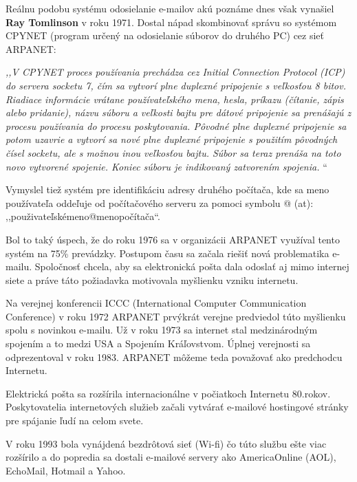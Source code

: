 \documentclass[10pt,slovak,twoside,a4paper]{article}
\begin{document}
Reálnu podobu systému odosielanie e-mailov akú poznáme dnes však vynašiel \textbf{Ray Tomlinson} v roku 1971. Dostal nápad skombinovať správu so systémom CPYNET (program určený na odosielanie súborov do druhého PC) cez sieť ARPANET:
\par
\vspace{.3cm}
\textit{,,V CPYNET proces používania prechádza cez Initial Connection Protocol (ICP) do servera socketu 7, čím sa vytvorí plne duplexné pripojenie s veľkosťou 8 bitov. Riadiace informácie vrátane používateľského mena, hesla, príkazu (čítanie, zápis alebo pridanie), názvu súboru a veľkosti bajtu pre dátové pripojenie sa prenášajú z procesu používania do procesu poskytovania. Pôvodné plne duplexné pripojenie sa potom uzavrie a vytvorí sa nové plne duplexné pripojenie s použitím pôvodných čísel socketu, ale s možnou inou veľkosťou bajtu. Súbor sa teraz prenáša na toto novo vytvorené spojenie. Koniec súboru je indikovaný zatvorením spojenia.} \cite{Bhushan}“
\par
\vspace{.3cm}
Vymyslel tiež systém pre identifikáciu adresy druhého počítača, kde sa meno používateľa oddeľuje od počítačového serveru za pomoci symbolu @ (at): ,,použivateľskémeno@menopočítača“.  

Bol to taký úspech, že do roku 1976 sa v organizácii ARPANET využíval tento systém na 75\% prevádzky. Postupom času sa začala riešiť nová problematika e-mailu. Spoločnosť chcela, aby sa elektronická pošta dala odoslať aj mimo internej siete a práve táto požiadavka motivovala myšlienku vzniku internetu. 

Na verejnej konferencii ICCC (International Computer Communication Conference) v roku 1972 ARPANET prvýkrát verejne predviedol túto myšlienku spolu s novinkou e-mailu. Už v roku 1973 sa internet stal medzinárodným spojením a to medzi USA a Spojením Kráľovstvom. Úplnej verejnosti sa odprezentoval v roku 1983. ARPANET môžeme teda považovať ako predchodcu Internetu. 

Elektrická pošta sa rozšírila internacionálne v počiatkoch Internetu 80.rokov. Poskytovatelia internetových služieb začali vytvárať e-mailové hostingové stránky pre spájanie ľudí na celom svete. 
 
V roku 1993 bola vynájdená bezdrôtová sieť (Wi-fi) čo túto službu ešte viac rozšírilo a do popredia sa dostali e-mailové servery ako AmericaOnline (AOL), EchoMail, Hotmail a Yahoo.\cite{UPI, Phrasee, Kleinrock}

\newpage
\end{document}
